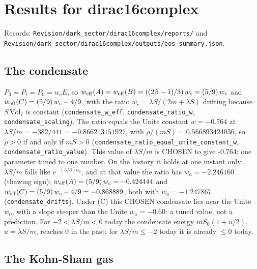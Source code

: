 \documentclass[11pt]{article}
\begin{document}
\section{Results for dirac16complex}

Records: \texttt{Revision\allowbreak{}/dark\_se\allowbreak{}ctor/dir\allowbreak{}ac16comp\allowbreak{}lex/repo\allowbreak{}rts/} and \texttt{Revision\allowbreak{}/dark\_se\allowbreak{}ctor/dir\allowbreak{}ac16comp\allowbreak{}lex/outp\allowbreak{}uts/eos-\allowbreak{}summary.\allowbreak{}json}.

\subsection{The condensate}

$P_3 = P_t = P_0 = w_cE$, so $w_{\rm eff}(A) = w_{\rm eff}(B) = ((2\beta - 1)/3)\,w_c = (5/9)\,w_c$ and $w_{\rm eff}(C) = (5/9)\,w_c - 4/9$, with the ratio $w_c = \lambda S/(2m + \lambda S)$ drifting because $S\,\mathrm{Vol}_7$ is constant (\texttt{condensa\allowbreak{}te\_w\_eff}, \texttt{condensa\allowbreak{}te\_ratio\allowbreak{}\_w}, \texttt{condensa\allowbreak{}te\_scali\allowbreak{}ng}). The ratio equals the Unite constant $w = -0.764$ at $\lambda S/m = -382/441 = -0.866213151927$, with $\rho/(mS) = 0.566893424036$, so $\rho > 0$ if and only if $mS > 0$ (\texttt{condensa\allowbreak{}te\_ratio\allowbreak{}\_equal\_u\allowbreak{}nite\_con\allowbreak{}stant\_w}, \texttt{condensa\allowbreak{}te\_ratio\allowbreak{}\_value}). This value of $\lambda S/m$ is CHOSEN to give -0.764: one parameter tuned to one number. On the history it holds at one instant only: $\lambda S/m$ falls like $e^{-(5/3)a_4}$, and at that value the ratio has $w_a = -2.246160$ (thawing sign); $w_{\rm eff}(A) = (5/9)\,w_c = -0.424444$ and $w_{\rm eff}(C) = (5/9)\,w_c - 4/9 = -0.868889$, both with $w_a = -1.247867$ (\texttt{condensa\allowbreak{}te\_drift\allowbreak{}s}). Under (C) this CHOSEN condensate lies near the Unite $w_0$, with a slope steeper than the Unite $w_a = -0.60$: a tuned value, not a prediction. For $-2 < \lambda S/m < 0$ today the condensate energy $mS_0(1 + u/2)$, $u = \lambda S/m$, reaches 0 in the past; for $\lambda S/m \leq -2$ today it is already $\leq 0$ today.

\subsection{The Kohn-Sham gas}
\end{document}
